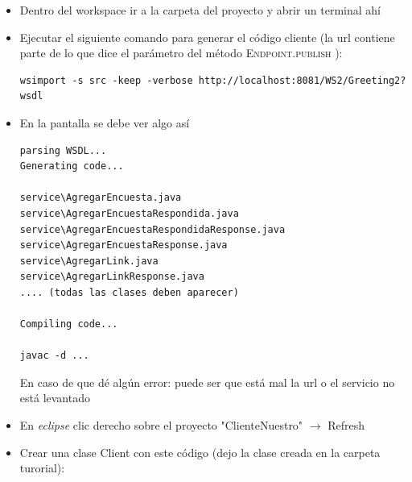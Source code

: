 \documentclass[12pt]{article}
\begin{document}
\begin{itemize}
\begin{minipage}[t]{\linewidth}
          \medskip
          \scriptsize En caso de que d\'e alg\'un error: puede ser que el puerto est\'e ocupado y haya que detener eso, aunque ac\'a se puede poner manualmente cualquier puerto cambiando el par\'ametro del m\'etodo \textsc{Endpoint.publish}.
    \end{minipage}
\item Dentro del workspace ir a la carpeta del proyecto y abrir un terminal ah\'i
    \begin{minipage}[t]{\linewidth}
          \raggedright

          \medskip
    \end{minipage}
\item Ejecutar el siguiente comando para generar el c\'odigo cliente (la url contiene parte de lo que dice el par\'ametro del m\'etodo \textsc{Endpoint.publish} ):
\begin{verbatim}
wsimport -s src -keep -verbose http://localhost:8081/WS2/Greeting2?wsdl
\end{verbatim}
\item En la pantalla se debe ver algo as\'i
\begin{verbatim}
parsing WSDL...
Generating code...

service\AgregarEncuesta.java
service\AgregarEncuestaRespondida.java
service\AgregarEncuestaRespondidaResponse.java
service\AgregarEncuestaResponse.java
service\AgregarLink.java
service\AgregarLinkResponse.java
.... (todas las clases deben aparecer)

Compiling code...

javac -d ...
\end{verbatim}
{
 \scriptsize En caso de que d\'e alg\'un error: puede ser que est\'a mal la url o el servicio no est\'a levantado }
\item En \emph{eclipse} clic derecho sobre el proyecto "ClienteNuestro"  $\rightarrow$ Refresh
\item Crear una clase Client con este c\'odigo (dejo la clase creada en la carpeta turorial):
\scriptsize
\begin{verbatim}


\end{verbatim}
\end{itemize}
\end{document}
